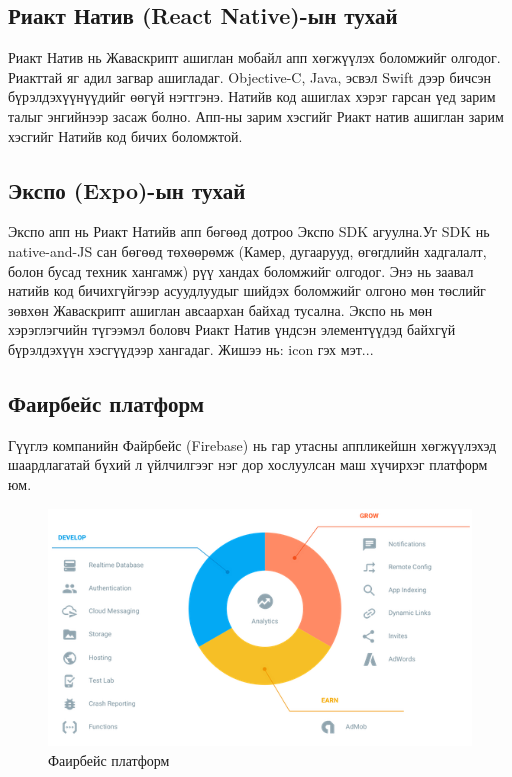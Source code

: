 \subsection{Риакт Натив (React Native)-ын тухай}
Риакт Натив нь Жаваскрипт ашиглан мобайл апп хөгжүүлэх боломжийг олгодог. Риакттай яг адил загвар ашигладаг. Objective-C, Java, эсвэл Swift дээр бичсэн бүрэлдэхүүнүүдийг өөгүй нэгтгэнэ. Натийв код ашиглах хэрэг гарсан үед зарим талыг энгийнээр засаж болно. Апп-ны зарим хэсгийг Риакт натив ашиглан зарим хэсгийг Натийв код бичих боломжтой.

\subsection{Экспо (Expo)-ын тухай}
Экспо апп нь Риакт Натийв апп бөгөөд дотроо Экспо SDK агуулна.Уг SDK нь native-and-JS сан бөгөөд төхөөрөмж (Камер, дугаарууд, өгөгдлийн хадгалалт, болон бусад техник хангамж) рүү хандах боломжийг олгодог. Энэ нь заавал натийв код бичихгүйгээр асуудлуудыг шийдэх боломжийг олгоно мөн төслийг зөвхөн Жаваскрипт ашиглан авсаархан байхад тусална. Экспо нь мөн хэрэглэгчийн түгээмэл боловч Риакт Натив үндсэн элементүүдэд байхгүй бүрэлдэхүүн хэсгүүдээр хангадаг. Жишээ нь: icon гэх мэт...

\subsection{Фаирбейс платформ}
Гүүглэ компанийн Файрбейс (Firebase) нь гар утасны аппликейшн хөгжүүлэхэд шаардлагатай бүхий л үйлчилгээг нэг дор хослуулсан маш хүчирхэг платформ юм. 
\begin{figure}[H]
	\centering
	\includegraphics[width=\textwidth]{Figures/sudalgaa/firebase.png}
	\caption{Фаирбейс платформ}
	\label{figure:social}
\end{figure}

